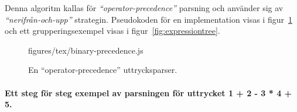 Denna algoritm kallas för \textit{``operator-precedence''} parsning och
använder sig av \textit{``nerifrån-och-upp''} strategin. Pseudokoden för en
implementation visas i figur~\ref{fig:binprecedence} och ett
grupperingsexempel visas i figur~\ref{fig:expressiontree}.

\begin{figure}[ht]
    {figures/tex/binary-precedence.js}
  \caption{En ``operator-precedence'' uttrycksparser.}
  \label{fig:binprecedence}
\end{figure}

\paragraph{Ett steg för steg exempel av parsningen för uttrycket 1 + 2 - 3 * 4
+ 5.}

